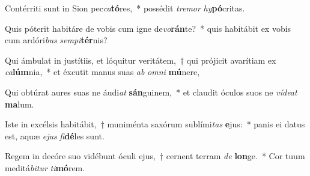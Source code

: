 \item Contérriti sunt in Sion pec\textit{ca}\textbf{tó}res,~* possédit \textit{tre}\textit{mor} \textit{hy}\textbf{pó}critas.
\item Quis póterit habitáre de vobis cum igne de\textit{vo}\textbf{rán}te?~* quis habitábit ex vobis cum ardóri\textit{bus} \textit{sem}\textit{pi}\textbf{tér}nis?
\item Qui ámbulat in justítiis, et lóquitur veritátem,~† qui prójicit avarítiam ex \textit{ca}\textbf{lúm}nia,~* et éxcutit manus suas \textit{ab} \textit{om}\textit{ni} \textbf{mú}nere,
\item Qui obtúrat aures suas ne áudi\textit{at} \textbf{sán}guinem,~* et claudit óculos suos ne \textit{ví}\textit{de}\textit{at} \textbf{ma}lum.
\item Iste in excélsis habitábit,~† muniménta saxórum sublími\textit{tas} \textbf{e}jus:~* panis ei datus est, aquæ \textit{e}\textit{jus} \textit{fi}\textbf{dé}les sunt.
\item Regem in decóre suo vidébunt óculi ejus,~† cernent terram \textit{de} \textbf{lon}ge.~* Cor tuum meditá\textit{bi}\textit{tur} \textit{ti}\textbf{mó}rem.
